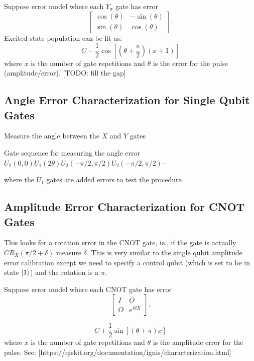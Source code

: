 \documentclass[11pt, oneside]{article}   	%
\begin{document}
Suppose error model where each $Y_{\pi}$ gate has error
\begin{equation}
\begin{bmatrix}
\cos (\theta) & - \sin (\theta) \\
\sin (\theta) & \cos (\theta)
\end{bmatrix}.
\end{equation}
Excited state population can be fit as:
\begin{equation}
C - \frac{1}{2} \cos \left[ \left( \theta + \frac{\pi}{2} \right) (x + 1) \right]
\end{equation}
where $x$ is the number of gate repetitions and $\theta$ is the error for the pulse (amplitude/error). [TODO: fill the gap]

\subsection{Angle Error Characterization for Single Qubit Gates}
Measure the angle between the $X$ and $Y$ gates

Gate sequence for measuring the angle error
$U_2(0, 0) U_1 (2 \theta) U_2(- \pi/2, \pi/2) U_2(- \pi/2, \pi/2) \cdots$

where the $U_1$ gates are added errors to test the procedure

\subsection{Amplitude Error Characterization for CNOT Gates}
This looks for a rotation error in the CNOT gate, ie., if the gate is actually $CR_X(\pi/2+\delta)$ measure $\delta$. 
This is very similar to the single qubit amplitude error calibration except we need to specify a control qubit (which is set to be in state $\ket{1}$) and the rotation is a $\pi$.

Suppose error model where each CNOT gate has error
\begin{equation}
\begin{bmatrix}
I & O \\
O & e^{i \theta X}
\end{bmatrix}.
\end{equation}

\begin{equation}
C + \frac{1}{2} \sin \left[ \left( \theta + \pi\right) x \right]
\end{equation}
where $x$ is the number of gate repetitions and $\theta$ is the amplitude error for the pulse.
See: [https://qiskit.org/documentation/ignis/characterization.html]
\end{document}
